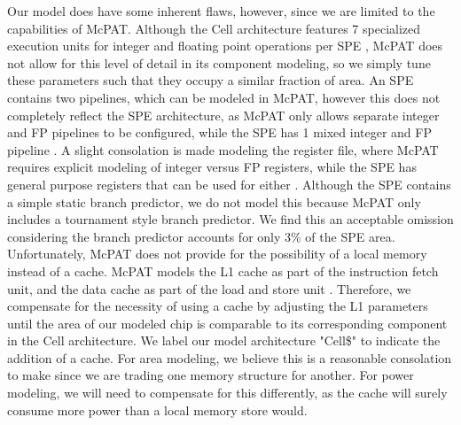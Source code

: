 \documentclass{sig-alternate-05-2015}
\begin{document}
Our model does have some inherent flaws, however, since we are limited to the capabilities of McPAT. Although the Cell architecture features 7 specialized execution units for integer and floating point operations per SPE \cite{flachs2006microarchitecture}, McPAT does not allow for this level of detail in its component modeling, so we simply tune these parameters such that they occupy a similar fraction of area. An SPE contains two pipelines, which can be modeled in McPAT, however this does not completely reflect the SPE architecture, as McPAT only allows separate integer and FP pipelines to be configured, while the SPE has 1 mixed integer and FP pipeline \cite{flachs2006microarchitecture}. A slight consolation is made modeling the register file, where McPAT requires explicit modeling of integer versus FP registers, while the SPE has general purpose registers that can be used for either \cite{flachs2006microarchitecture}. Although the SPE contains a simple static branch predictor, we do not model this because McPAT only includes a tournament style branch predictor. We find this an acceptable omission considering the branch predictor accounts for only 3\% of the SPE area. Unfortunately, McPAT does not provide for the possibility of a local memory instead of a cache. McPAT models the L1 cache as part of the instruction fetch unit, and the data cache as part of the load and store unit \cite{li2009mcpat}. Therefore, we compensate for the necessity of using a cache by adjusting the L1 parameters until the area of our modeled chip is comparable to its corresponding component in the Cell architecture. We label our model architecture "Cell\$" to indicate the addition of a cache. For area modeling, we believe this is a reasonable consolation to make since we are trading one memory structure for another. For power modeling, we will need to compensate for this differently, as the cache will surely consume more power than a local memory store would.
\end{document}
